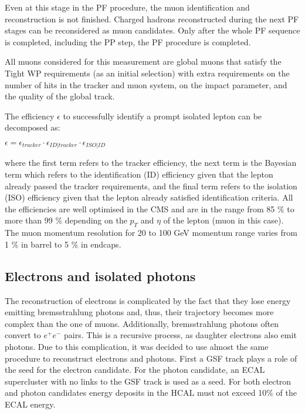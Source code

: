 Even at this stage in the PF procedure, the muon identification and reconstruction is not finished. Charged hadrons reconstructed during the next PF stages can be reconsidered as muon candidates. Only after the whole PF sequence is completed, including the PP step, the PF procedure is completed.

All muons considered for this measurement are global muons that satisfy the Tight WP requirements (as an initial selection) with extra requirements on the number of hits in the tracker and muon system, on the impact parameter, and the quality of the global track. 

The efficiency $\epsilon$ to successfully identify a prompt isolated lepton can be decomposed as:

$\epsilon = \epsilon_{tracker} \cdot \epsilon_{ID | tracker} \cdot \epsilon_{ISO | ID} $

\noindent where the first term refers to the tracker efficiency, the next term is the Bayesian term which refers to the identification (ID) efficiency given that the lepton already passed the tracker requirements, and the final term refers to the isolation (ISO) efficiency given that the lepton already satisfied identification criteria. All the efficiencies are well optimised in the CMS and are in the range from 85 $\%$ to more than 99 $\%$ depending on the $p_T$ and $\eta$ of the lepton (muon in this case). The muon momentum resolution for 20 to 100 GeV momentum range varies from 1 $\%$ in barrel to 5 $\%$ in endcaps.

\subsection{Electrons and isolated photons}\label{sec:electrons}

The reconstruction of electrons is complicated by the fact that they lose energy emitting bremsstrahlung photons and, thus, their trajectory becomes more complex than the one of muons. Additionally, bremsstrahlung photons often convert to $e^+ e^-$ pairs. This is a recursive process, as daughter electrons also emit photons. Due to this complication, it was decided to use almost the same procedure to reconstruct electrons and photons. First a GSF track plays a role of the seed for the electron candidate. For the photon candidate, an ECAL supercluster with no links to the GSF track is used as a seed. For both electron and photon candidates energy deposits in the HCAL must not exceed 10$\%$ of the ECAL energy. 

